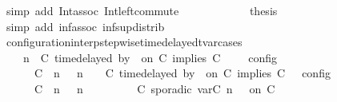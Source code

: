 \begin{isabellebody}
\ {\isacharparenleft}simp\ add{\isacharcolon}\ Int{\isacharunderscore}assoc\ Int{\isacharunderscore}left{\isacharunderscore}commute{\isacharparenright}\isanewline
\ \ \ \ \isamarkupfalse%
\isanewline
\ \ \ \ \isamarkupfalse%
\ \isamarkupfalse%
\ {\isacharquery}thesis\ \isamarkupfalse%
\ {\isacharparenleft}simp\ add{\isacharcolon}\ inf{\isacharunderscore}assoc\ inf{\isacharunderscore}sup{\isacharunderscore}distrib{}{\isacharparenright}\isanewline
\ \ \isamarkupfalse%
\isanewline
{}\isamarkupfalse%
%
\endisatagproof
{\isafoldproof}%
%
\isadelimproof
\isanewline
%
\endisadelimproof
\isanewline
{}\isamarkupfalse%
\ configuration{\isacharunderscore}interp{\isacharunderscore}stepwise{\isacharunderscore}timedelayed{\isacharunderscore}tvar{\isacharunderscore}cases{\isacharcolon}\isanewline
\ \ {\isacartoucheopen}{\isasymlbrakk}\ {\isasymGamma}{\isacharcomma}\ n\ {\isasymTurnstile}\ {\isacharparenleft}{\isacharparenleft}C\ time{\isacharminus}delayed{\isasymbowtie}\ by\ {\isasymdelta}{\isasymtau}\ on\ C\ implies\ C\ {\isacharhash}\ {\isasymPsi}{\isacharparenright}\ {\isasymtriangleright}\ {\isasymPhi}\ {\isasymrbrakk}\isactrlsub c\isactrlsub o\isactrlsub n\isactrlsub f\isactrlsub i\isactrlsub g\isanewline
\ \ \ \ {\isacharequal}\ {\isasymlbrakk}\ {\isacharparenleft}{\isacharparenleft}C\ {\isasymnot}{\isasymUp}\ n{\isacharparenright}\ {\isacharhash}\ {\isasymGamma}{\isacharparenright}{\isacharcomma}\ n\ {\isasymTurnstile}\ {\isasymPsi}\ {\isasymtriangleright}\ {\isacharparenleft}{\isacharparenleft}C\ time{\isacharminus}delayed{\isasymbowtie}\ by\ {\isasymdelta}{\isasymtau}\ on\ C\ implies\ C\ {\isacharhash}\ {\isasymPhi}{\isacharparenright}\ {\isasymrbrakk}\isactrlsub c\isactrlsub o\isactrlsub n\isactrlsub f\isactrlsub i\isactrlsub g\isanewline
\ \ \ \ {\isasymunion}\ {\isasymlbrakk}\ {\isacharparenleft}{\isacharparenleft}C\ {\isasymUp}\ n{\isacharparenright}\ {\isacharhash}\ {\isasymGamma}{\isacharparenright}{\isacharcomma}\ n\isanewline
\ \ \ \ \ \ \ \ {\isasymTurnstile}\ {\isacharparenleft}C\ sporadic{\isasymsharp}\ {\isasymlparr}{\isasymtau}\isactrlsub v\isactrlsub a\isactrlsub r{\isacharparenleft}C\ n{\isacharparenright}\ {\isasymoplus}\ {\isasymdelta}{\isasymtau}{\isasymrparr}\ on\ C\ {\isacharhash}\ {\isasymPsi}\isanewline

\end{isabellebody}
